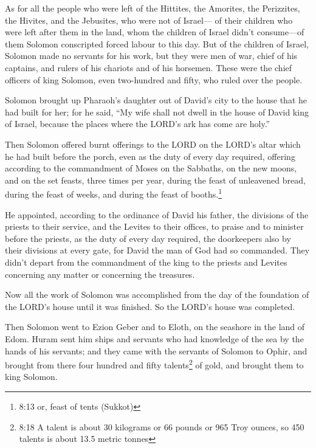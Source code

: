  As for all the people who were left of the Hittites, the
Amorites, the Perizzites, the Hivites, and the Jebusites, who were not
of Israel---  of their children who were left after them in
the land, whom the children of Israel didn't consume---of them Solomon
conscripted forced labour to this day.  But of the children
of Israel, Solomon made no servants for his work, but they were men of
war, chief of his captains, and rulers of his chariots and of his
horsemen.  These were the chief officers of king Solomon,
even two-hundred and fifty, who ruled over the people.

 Solomon brought up Pharaoh's daughter out of David's city
to the house that he had built for her; for he said, ``My wife shall not
dwell in the house of David king of Israel, because the places where the
LORD's ark has come are holy.''

 Then Solomon offered burnt offerings to the LORD on the
LORD's altar which he had built before the porch,  even as
the duty of every day required, offering according to the commandment of
Moses on the Sabbaths, on the new moons, and on the set feasts, three
times per year, during the feast of unleavened bread, during the feast
of weeks, and during the feast of booths.\footnote{8:13 or, feast of
  tents (Sukkot)}

 He appointed, according to the ordinance of David his
father, the divisions of the priests to their service, and the Levites
to their offices, to praise and to minister before the priests, as the
duty of every day required, the doorkeepers also by their divisions at
every gate, for David the man of God had so commanded. 
They didn't depart from the commandment of the king to the priests and
Levites concerning any matter or concerning the treasures.

 Now all the work of Solomon was accomplished from the day
of the foundation of the LORD's house until it was finished. So the
LORD's house was completed.

 Then Solomon went to Ezion Geber and to Eloth, on the
seashore in the land of Edom.  Huram sent him ships and
servants who had knowledge of the sea by the hands of his servants; and
they came with the servants of Solomon to Ophir, and brought from there
four hundred and fifty talents\footnote{8:18 A talent is about 30
  kilograms or 66 pounds or 965 Troy ounces, so 450 talents is about
  13.5 metric tonnes} of gold, and brought them to king Solomon.

